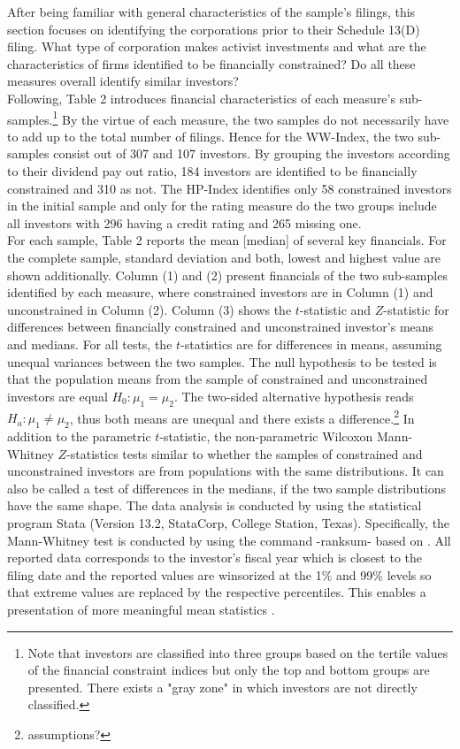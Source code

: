 \documentclass[12pt]{article}
\begin{document}
After being familiar with general characteristics of the sample's filings, this section focuses on identifying the corporations prior to their Schedule 13(D) filing. What type of corporation makes activist investments and what are the characteristics of firms identified to be financially constrained? Do all these measures overall identify similar investors?\\
Following, Table 2 introduces financial characteristics of each measure's sub-samples.\footnote{Note that investors are classified into three groups based on the tertile values of the financial constraint indices but only the top and bottom groups are presented. There exists a "gray zone" in which investors are not directly classified.} By the virtue of each measure, the two samples do not necessarily have to add up to the total number of filings. Hence for the WW-Index, the two sub-samples consist out of 307 and 107 investors. By grouping the investors according to their dividend pay out ratio, 184 investors are identified to be financially constrained and 310 as not. The HP-Index identifies only 58 constrained investors in the initial sample and only for the rating measure do the two groups include all investors with 296 having a credit rating and 265 missing one.\\
For each sample, Table 2 reports the mean [median] of several key financials. For the complete sample, standard deviation and both, lowest and highest value are shown additionally. Column (1) and (2) present financials of the two sub-samples identified by each measure, where constrained investors are in Column (1) and unconstrained in Column (2). Column (3) shows the $t$-statistic and $Z$-statistic for differences between financially constrained and unconstrained investor's means and medians. For all tests, the $t$-statistics are for differences in means, assuming unequal variances between the two samples. The null hypothesis to be tested is that the population means from the sample of constrained and unconstrained investors are equal $H_{0}: \mu_{1}=\mu_{2}$. The two-sided alternative hypothesis reads $H_{a}: \mu_{1}\neq\mu_{2}$, thus both means are unequal and there exists a difference.\footnote{assumptions?} In addition to the parametric $t$-statistic, the non-parametric Wilcoxon Mann-Whitney $Z$-statistics tests similar to \citet[p.201]{Klein2009} whether the samples of constrained and unconstrained investors are from populations with the same distributions. It can also be called a test of differences in the medians, if the two sample distributions have the same shape. The data analysis is conducted by using the statistical program Stata (Version 13.2, StataCorp, College Station, Texas). Specifically, the Mann-Whitney test is conducted by using the command -ranksum- based on \citet[p.59]{Mann1947}. All reported data corresponds to the investor's fiscal year which is closest to the filing date and the reported values are winsorized at the 1\% and 99\% levels so that extreme values are replaced by the respective percentiles. This enables a presentation of more meaningful mean statistics \citep[p.203]{Klein2009}. 
\pagebreak
\end{document}
